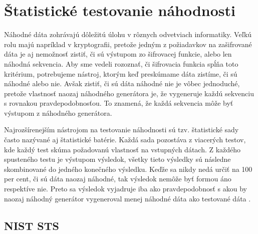 \chapter{Štatistické testovanie náhodnosti}
\label{chap:statistic-tests}

Náhodné dáta zohrávajú dôležitú úlohu v rôznych odvetviach informatiky. Veľkú rolu majú napríklad v kryptografii, pretože jedným z požiadavkov na zašifrované dáta je aj nemožnosť zistiť, či sú výstupom zo šifrovacej funkcie, alebo len náhodná sekvencia. Aby sme vedeli rozoznať, či šifrovacia funkcia spĺňa toto kritérium, potrebujeme nástroj, ktorým keď preskúmame dáta zistíme, či sú náhodné alebo nie. Avšak zistiť, či sú dáta náhodné nie je vôbec jednoduché, pretože vlastnosť naozaj náhodného generátora je, že vygeneruje každú sekvenciu s rovnakou pravdepodobnosťou. To znamená, že každá sekvencia môže byť výstupom z náhodného generátora.

Najrozšírenejším nástrojom na testovanie náhodnosti sú tzv. štatistické sady často nazývané aj štatistické batérie. Každá sada pozostáva z viacerých testov, kde každý test skúma požadovanú vlastnosť na vstupných dátach. Z každého spusteného testu je výstupom výsledok, všetky tieto výsledky sú následne skombinované do jedného konečného výsledku. Keďže sa nikdy nedá určiť na 100 per cent, či sú dáta naozaj náhodné, tak výsledok nemôže byť formou áno respektíve nie. Preto sa výsledok vyjadruje iba ako pravdepodobnosť s akou by naozaj náhodný generátor vygeneroval menej náhodné dáta ako testované dáta \cite{nist-sts-interpretation-syso}. 

\section{NIST STS}
\label{sec:sts-nist}

